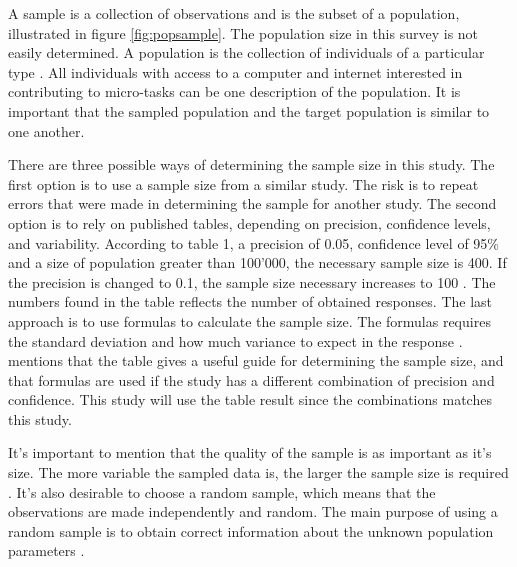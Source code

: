 A sample is a collection of observations and is the subset of a population, illustrated in figure \ref{fig:popsample}. The population size in this survey is not easily determined. A population is the collection of individuals of a particular type \citep{Walpole2012}. All individuals with access to a computer and internet interested in contributing to micro-tasks can be one description of the population. It is important that the sampled population and the target population is similar to one another.

There are three possible ways of determining the sample size in this study. The first option is to use a sample size from a similar study. The risk is to repeat errors that were made in determining the sample for another study. The second option is to rely on published tables, depending on precision, confidence levels, and variability. According to \cite{Israel1992} table 1, a precision of 0.05, confidence level of 95\% and a size of population greater than 100'000, the necessary sample size is 400. If the precision is changed to 0.1, the sample size necessary increases to 100 \citep{Israel1992}. The numbers found in the table reflects the number of obtained responses. The last approach is to use formulas to calculate the sample size. The formulas requires the standard deviation and how much variance to expect in the response \citep{Smith2013}\citep{Israel1992}. \cite{Israel1992} mentions that the table gives a useful guide for determining the sample size, and that formulas are used if the study has a different combination of precision and confidence. This study will use the table result since the combinations matches this study.

It's important to mention that the quality of the sample is as important as it's size. The more variable the sampled data is, the larger the sample size is required \citep{Israel1992}. It's also desirable to choose a random sample, which means that the observations are made independently and random. The main purpose of using a random sample is to obtain correct information about the unknown population parameters \citep{Walpole2012}. 



